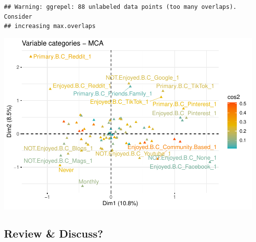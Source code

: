 \documentclass[
]{article}
\newenvironment{Shaded}{\begin{snugshade}}{\end{snugshade}}
\newcommand{\DataTypeTok}[1]{\textcolor[rgb]{0.13,0.29,0.53}{#1}}
\newcommand{\KeywordTok}[1]{\textcolor[rgb]{0.13,0.29,0.53}{\textbf{#1}}}
\newcommand{\NormalTok}[1]{#1}
\newcommand{\OtherTok}[1]{\textcolor[rgb]{0.56,0.35,0.01}{#1}}
\newcommand{\StringTok}[1]{\textcolor[rgb]{0.31,0.60,0.02}{#1}}
\begin{document}
\begin{Shaded}
\end{Shaded}

\begin{verbatim}
## Warning: ggrepel: 88 unlabeled data points (too many overlaps). Consider
## increasing max.overlaps
\end{verbatim}

\includegraphics{Average-User-MCA_files/figure-latex/mca browsing all-3.pdf}

\hypertarget{review-discuss}{%
\subsection{Review \& Discuss?}\label{review-discuss}}
\end{document}
